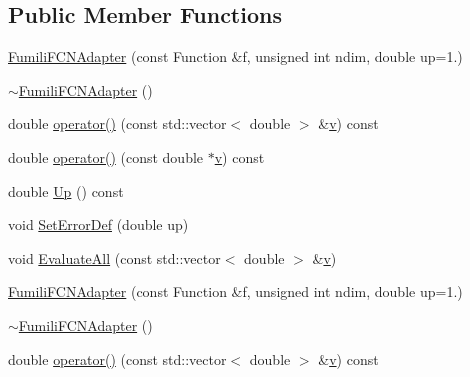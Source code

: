 \subsection*{Public Member Functions}
\begin{DoxyCompactItemize}
\item 
\mbox{\hyperlink{classROOT_1_1Minuit2_1_1FumiliFCNAdapter_a86273eee185e8728ef9bfa5c89bdd621}{Fumili\+F\+C\+N\+Adapter}} (const Function \&f, unsigned int ndim, double up=1.)
\item 
\mbox{\hyperlink{classROOT_1_1Minuit2_1_1FumiliFCNAdapter_ab6c007ce98fb307fc026a52832c39313}{$\sim$\+Fumili\+F\+C\+N\+Adapter}} ()
\item 
double \mbox{\hyperlink{classROOT_1_1Minuit2_1_1FumiliFCNAdapter_a7381e9f93fbec9e0504e3e340c281056}{operator()}} (const std\+::vector$<$ double $>$ \&\mbox{\hyperlink{adat__devel_2lib_2hadron_2hadron__timeslice_8cc_a716fc87f5e814be3ceee2405ed6ff22a}{v}}) const
\item 
double \mbox{\hyperlink{classROOT_1_1Minuit2_1_1FumiliFCNAdapter_a0e1a10d68960c681ab3e4d5af5c1018b}{operator()}} (const double $\ast$\mbox{\hyperlink{adat__devel_2lib_2hadron_2hadron__timeslice_8cc_a716fc87f5e814be3ceee2405ed6ff22a}{v}}) const
\item 
double \mbox{\hyperlink{classROOT_1_1Minuit2_1_1FumiliFCNAdapter_aeed5b77f0bcca4854a9e6b0620ab3cb9}{Up}} () const
\item 
void \mbox{\hyperlink{classROOT_1_1Minuit2_1_1FumiliFCNAdapter_a4c854e9ce5324ee557f818ecf5f00fb1}{Set\+Error\+Def}} (double up)
\item 
void \mbox{\hyperlink{classROOT_1_1Minuit2_1_1FumiliFCNAdapter_a75bacae09c510900a45ea753afae971a}{Evaluate\+All}} (const std\+::vector$<$ double $>$ \&\mbox{\hyperlink{adat__devel_2lib_2hadron_2hadron__timeslice_8cc_a716fc87f5e814be3ceee2405ed6ff22a}{v}})
\item 
\mbox{\hyperlink{classROOT_1_1Minuit2_1_1FumiliFCNAdapter_a86273eee185e8728ef9bfa5c89bdd621}{Fumili\+F\+C\+N\+Adapter}} (const Function \&f, unsigned int ndim, double up=1.)
\item 
\mbox{\hyperlink{classROOT_1_1Minuit2_1_1FumiliFCNAdapter_ab6c007ce98fb307fc026a52832c39313}{$\sim$\+Fumili\+F\+C\+N\+Adapter}} ()
\item 
double \mbox{\hyperlink{classROOT_1_1Minuit2_1_1FumiliFCNAdapter_a7381e9f93fbec9e0504e3e340c281056}{operator()}} (const std\+::vector$<$ double $>$ \&\mbox{\hyperlink{adat__devel_2lib_2hadron_2hadron__timeslice_8cc_a716fc87f5e814be3ceee2405ed6ff22a}{v}}) const

\end{DoxyCompactItemize}
